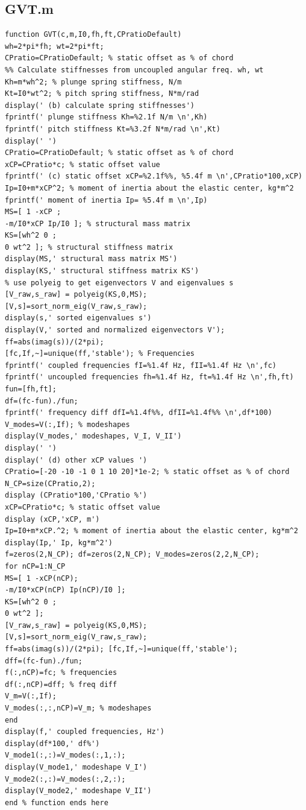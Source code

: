 \documentclass{article}
\begin{document}
\subsection{GVT.m}
\begin{lstlisting}[caption={Helper script for Homework 1.}, label={lst:main_script}]
function GVT(c,m,I0,fh,ft,CPratioDefault)
wh=2*pi*fh; wt=2*pi*ft;
CPratio=CPratioDefault; % static offset as % of chord
%% Calculate stiffnesses from uncoupled angular freq. wh, wt
Kh=m*wh^2; % plunge spring stiffness, N/m
Kt=I0*wt^2; % pitch spring stiffness, N*m/rad
display(' (b) calculate spring stiffnesses')
fprintf(' plunge stiffness Kh=%2.1f N/m \n',Kh)
fprintf(' pitch stiffness Kt=%3.2f N*m/rad \n',Kt)
display(' ')
CPratio=CPratioDefault; % static offset as % of chord
xCP=CPratio*c; % static offset value
fprintf(' (c) static offset xCP=%2.1f%%, %5.4f m \n',CPratio*100,xCP)
Ip=I0+m*xCP^2; % moment of inertia about the elastic center, kg*m^2
fprintf(' moment of inertia Ip= %5.4f m \n',Ip)
MS=[ 1 -xCP ;
-m/I0*xCP Ip/I0 ]; % structural mass matrix
KS=[wh^2 0 ;
0 wt^2 ]; % structural stiffness matrix
display(MS,' structural mass matrix MS')
display(KS,' structural stiffness matrix KS')
% use polyeig to get eigenvectors V and eigenvalues s
[V_raw,s_raw] = polyeig(KS,0,MS);
[V,s]=sort_norm_eig(V_raw,s_raw);
display(s,' sorted eigenvalues s')
display(V,' sorted and normalized eigenvectors V');
ff=abs(imag(s))/(2*pi);
[fc,If,~]=unique(ff,'stable'); % Frequencies
fprintf(' coupled frequencies fI=%1.4f Hz, fII=%1.4f Hz \n',fc)
fprintf(' uncoupled frequencies fh=%1.4f Hz, ft=%1.4f Hz \n',fh,ft)
fun=[fh,ft];
df=(fc-fun)./fun;
fprintf(' frequency diff dfI=%1.4f%%, dfII=%1.4f%% \n',df*100)
V_modes=V(:,If); % modeshapes
display(V_modes,' modeshapes, V_I, V_II')
display(' ')
display(' (d) other xCP values ')
CPratio=[-20 -10 -1 0 1 10 20]*1e-2; % static offset as % of chord
N_CP=size(CPratio,2);
display (CPratio*100,'CPratio %')
xCP=CPratio*c; % static offset value
display (xCP,'xCP, m')
Ip=I0+m*xCP.^2; % moment of inertia about the elastic center, kg*m^2
display(Ip,' Ip, kg*m^2')
f=zeros(2,N_CP); df=zeros(2,N_CP); V_modes=zeros(2,2,N_CP);
for nCP=1:N_CP
MS=[ 1 -xCP(nCP);
-m/I0*xCP(nCP) Ip(nCP)/I0 ];
KS=[wh^2 0 ;
0 wt^2 ];
[V_raw,s_raw] = polyeig(KS,0,MS);
[V,s]=sort_norm_eig(V_raw,s_raw);
ff=abs(imag(s))/(2*pi); [fc,If,~]=unique(ff,'stable');
dff=(fc-fun)./fun;
f(:,nCP)=fc; % frequencies
df(:,nCP)=dff; % freq diff
V_m=V(:,If);
V_modes(:,:,nCP)=V_m; % modeshapes
end
display(f,' coupled frequencies, Hz')
display(df*100,' df%')
V_mode1(:,:)=V_modes(:,1,:);
display(V_mode1,' modeshape V_I')
V_mode2(:,:)=V_modes(:,2,:);
display(V_mode2,' modeshape V_II')
end % function ends here
\end{lstlisting}
\end{document}
